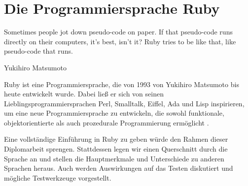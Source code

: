 \chapter{Die Programmiersprache Ruby}
\label{sec:ruby}
\epigraph{Sometimes people jot down pseudo-code on paper. If that pseudo-code runs directly on their computers, it's best, isn't it? Ruby tries to be like that, like pseudo-code that runs.}{Yukihiro Matsumoto}

Ruby ist eine Programmiersprache, die von 1993 von Yukihiro Matsumoto bis heute entwickelt wurde. Dabei ließ er sich von seinen Lieblingsprogrammiersprachen Perl, Smalltalk, Eiffel, Ada und Lisp inspirieren, um eine neue Programmiersprache zu entwickeln, die sowohl funktionale, objektorientierte als auch prozedurale Programmierung ermöglicht \citep{ruby_visual_identity_team_about_2011}.

Eine vollständige Einführung in Ruby zu geben würde den Rahmen dieser Diplomarbeit sprengen. Stattdessen legen wir einen Querschnitt durch die Sprache an und stellen die Hauptmerkmale und Unterschiede zu anderen Sprachen heraus. Auch werden Auswirkungen auf das Testen diskutiert und mögliche Testwerkzeuge vorgestellt.


